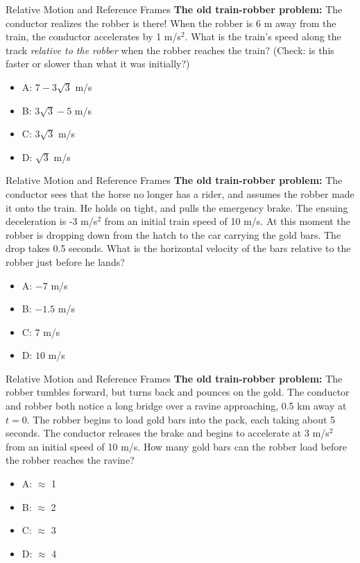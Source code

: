 \documentclass{beamer}
\begin{document}
\begin{frame}{Relative Motion and Reference Frames}
\small 
\textbf{The old train-robber problem:} The conductor realizes the robber is there!  When the robber is 6 m away from the train, the conductor accelerates by 1 m/s$^2$.  What is the train's speed along the track \textit{relative to the robber} when the robber reaches the train? (Check: is this faster or slower than what it was initially?)\\
\begin{itemize}
\item A: $7-3\sqrt{3}$ m/s
\item B: $3\sqrt{3}-5$ m/s
\item C: $3\sqrt{3}$  m/s
\item D: $\sqrt{3}$  m/s
\end{itemize}
\end{frame}

\begin{frame}{Relative Motion and Reference Frames}
\small 
\textbf{The old train-robber problem:} The conductor sees that the horse no longer has a rider, and assumes the robber made it onto the train.  He holds on tight, and pulls the emergency brake.  The ensuing deceleration is -3 m/s$^2$ from an initial train speed of 10 m/s.  At this moment the robber is dropping down from the hatch to the car carrying the gold bars.  The drop takes 0.5 seconds.  What is the horizontal velocity of the bars relative to the robber just before he lands?\\
\begin{itemize}
\item A: $-7$ m/s
\item B: $-1.5$ m/s
\item C: $7$  m/s
\item D: $10$  m/s
\end{itemize}
\end{frame}

\begin{frame}{Relative Motion and Reference Frames}
\small 
\textbf{The old train-robber problem:} The robber tumbles forward, but turns back and pounces on the gold.  The conductor and robber both notice a long bridge over a ravine approaching, 0.5 km away at $t=0$.  The robber begins to load gold bars into the pack, each taking about 5 seconds.  The conductor releases the brake and begins to accelerate at 3 m/s$^2$ from an initial speed of 10 m/s.  How many gold bars can the robber load before the robber reaches the ravine?\\
\begin{itemize}
\item A: $\approx$ 1
\item B: $\approx$ 2
\item C: $\approx$ 3
\item D: $\approx$ 4
\end{itemize}
\end{frame}
\end{document}
